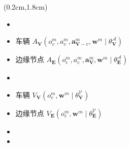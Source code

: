 \begin{frame}
\begin{center}
\begin{textblock*}{0.6\textwidth}(0.2cm,1.8cm)
\begin{itemize} \englishfont
	\item[\ding{111}] {\color{cqublue}{动作优势网络 (AA)}}
	\item 车辆 {\small{$A_{\mathbf{V}}\left({o}_{v}^{m},  {a}_{v}^{m}, \boldsymbol{a}_{\boldsymbol{\mathbf{V}}-v}^{m}, \boldsymbol{w}^{m} \mid \theta_{\mathbf{V}}^{\mathscr{A}} \right)$}}
	\item 边缘节点 {\small{$A_{\mathbf{E}}\left({o}_{e}^{m},  {a}_{e}^{m}, \boldsymbol{a}_{\boldsymbol{\mathbf{V}}}^{m}, \boldsymbol{w}^{m} \mid \theta_{\mathbf{E}}^{\mathscr{A}} \right)$}}
	\item[\ding{111}] {\color{cqublue}{状态价值网络 (SV)}}
	\item 车辆 {\small{$V_{\mathbf{V}}\left({o}_{v}^{m}, \boldsymbol{w}^{m} \mid \theta_{\mathbf{V}}^{\mathscr{V}} \right)$}}
	\item 边缘节点 {\small{$V_{\mathbf{E}}\left({o}_{e}^{m}, \boldsymbol{w}^{m} \mid \theta_{\mathbf{E}}^{\mathscr{V}} \right)$}}
	\item[\ding{111}] {\color{cqublue}{动作价值}}
	\item 
\end{itemize}
\end{textblock*}
\end{center}
\end{frame}

